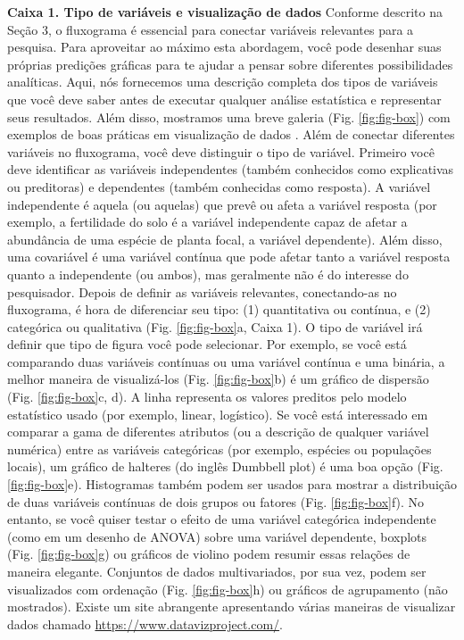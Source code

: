 \documentclass[
]{book}
\renewenvironment{quote}{\begin{VF}}{\end{VF}}
\begin{document}
\begin{quote}
\textbf{Caixa 1. Tipo de variáveis e visualização de dados} Conforme descrito na Seção 3, o fluxograma é essencial para conectar variáveis relevantes para a pesquisa. Para aproveitar ao máximo esta abordagem, você pode desenhar suas próprias predições gráficas para te ajudar a pensar sobre diferentes possibilidades analíticas. Aqui, nós fornecemos uma descrição completa dos tipos de variáveis que você deve saber antes de executar qualquer análise estatística e representar seus resultados. Além disso, mostramos uma breve galeria (Fig. \ref{fig:fig-box}) com exemplos de boas práticas em visualização de dados \citep[Fig. \ref{fig:fig-research-flowchart}b, veja também figuras em][]{albuquerque_multidimensional_2019}. Além de conectar diferentes variáveis no fluxograma, você deve distinguir o tipo de variável. Primeiro você deve identificar as variáveis independentes (também conhecidos como explicativas ou preditoras) e dependentes (também conhecidas como resposta). A variável independente é aquela (ou aquelas) que prevê ou afeta a variável resposta (por exemplo, a fertilidade do solo é a variável independente capaz de afetar a abundância de uma espécie de planta focal, a variável dependente). Além disso, uma covariável é uma variável contínua que pode afetar tanto a variável resposta quanto a independente (ou ambos), mas geralmente não é do interesse do pesquisador. Depois de definir as variáveis relevantes, conectando-as no fluxograma, é hora de diferenciar seu tipo: (1) quantitativa ou contínua, e (2) categórica ou qualitativa (Fig. \ref{fig:fig-box}a, Caixa 1). O tipo de variável irá definir que tipo de figura você pode selecionar. Por exemplo, se você está comparando duas variáveis contínuas ou uma variável contínua e uma binária, a melhor maneira de visualizá-los (Fig. \ref{fig:fig-box}b) é um gráfico de dispersão (Fig. \ref{fig:fig-box}c, d). A linha representa os valores preditos pelo modelo estatístico usado (por exemplo, linear, logístico). Se você está interessado em comparar a gama de diferentes atributos (ou a descrição de qualquer variável numérica) entre as variáveis categóricas (por exemplo, espécies ou populações locais), um gráfico de halteres (do inglês Dumbbell plot) é uma boa opção (Fig. \ref{fig:fig-box}e). Histogramas também podem ser usados para mostrar a distribuição de duas variáveis contínuas de dois grupos ou fatores (Fig. \ref{fig:fig-box}f). No entanto, se você quiser testar o efeito de uma variável categórica independente (como em um desenho de ANOVA) sobre uma variável dependente, boxplots (Fig. \ref{fig:fig-box}g) ou gráficos de violino podem resumir essas relações de maneira elegante. Conjuntos de dados multivariados, por sua vez, podem ser visualizados com ordenação (Fig. \ref{fig:fig-box}h) ou gráficos de agrupamento (não mostrados). Existe um site abrangente apresentando várias maneiras de visualizar dados chamado \url{https://www.datavizproject.com/}.
\end{quote}
\end{document}
